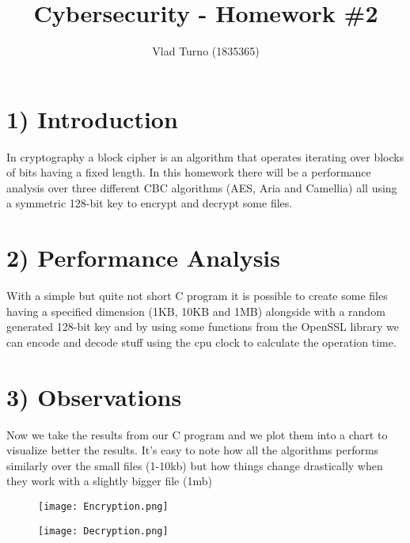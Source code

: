 \documentclass{article}
\title{Cybersecurity - Homework \#2}
\author{Vlad Turno (1835365)}
\begin{document}
\maketitle

\section*{1) Introduction}
In cryptography a block cipher is an algorithm that operates iterating over blocks of bits having a fixed length. In this homework there will be a performance analysis over three different CBC algorithms (AES, Aria and Camellia) all using a symmetric 128-bit key to encrypt and decrypt some files.

\section*{2) Performance Analysis}
With a simple but quite not short C program it is possible to create some files having a specified dimension (1KB, 10KB and 1MB) alongside with a random generated 128-bit key and by using some functions from the OpenSSL library we can encode and decode stuff using the cpu clock to calculate the operation time.\\



\section*{3) Observations}
Now we take the results from our C program and we plot them into a chart to visualize better the results. It's easy to note how all the algorithms performs similarly over the small files (1-10kb) but how things change drastically when they work with a slightly bigger file (1mb)\\

\begin{figure}[h]
  \centering
  \texttt{[image: Encryption.png]}
  \caption{}
  \label{fig:enc}
\end{figure}

\begin{figure}[h]
  \centering
  \texttt{[image: Decryption.png]}
  \caption{}
  \label{fig:enc}
\end{figure}
\end{document}
